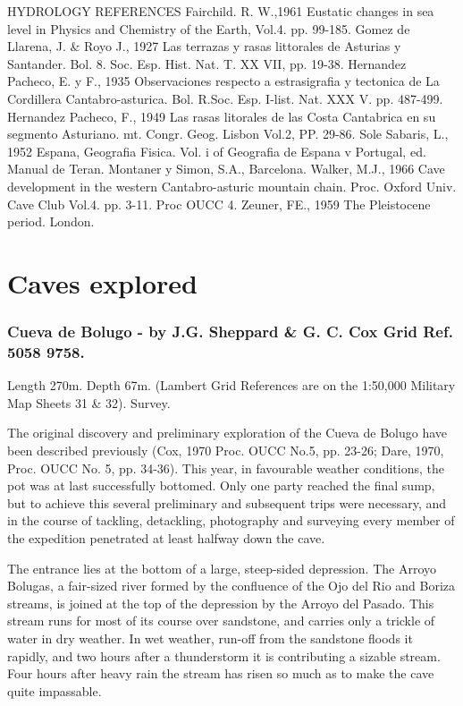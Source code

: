 \documentclass[11pt, a4paper, twoside]{memoir}
\begin{document}
HYDROLOGY REFERENCES
Fairchild. R. W.,1961 Eustatic changes in sea level in Physics and Chemistry of the Earth, Vol.4. pp. 99-185.
Gomez de Llarena, J. \& Royo J., 1927 Las terrazas y rasas littorales de Asturias y Santander. Bol. 8. Soc. Esp. Hist. Nat. T. XX VII, pp. 19-38.
Hernandez Pacheco, E. y F., 1935 Observaciones respecto a estrasigrafia y tectonica de La Cordillera Cantabro-asturica. Bol. R.Soc. Esp. I-list. Nat. XXX V. pp. 487-499.
Hernandez Pacheco, F., 1949 Las rasas litorales de las Costa Cantabrica en su segmento Asturiano. mt. Congr. Geog. Lisbon Vol.2, PP. 29-86.
Sole Sabaris, L., 1952 Espana, Geografia Fisica. Vol. i of Geografia de Espana v Portugal, ed. Manual de Teran. Montaner y Simon, S.A., Barcelona.
Walker, M.J., 1966 Cave development in the western Cantabro-asturic mountain chain. Proc. Oxford Univ. Cave Club Vol.4. pp. 3-11. Proc OUCC 4.
Zeuner, FE., 1959 The Pleistocene period. London.



\chapter{Caves explored}

\subsection*{Cueva de Bolugo - by J.G. Sheppard \& G. C. Cox Grid Ref. 5058 9758.}

Length 270m. Depth 67m. (Lambert Grid References are on the 1:50,000 Military Map Sheets 31 \& 32). Survey.

The original discovery and preliminary exploration of the Cueva de Bolugo have been described previously (Cox, 1970 Proc. OUCC No.5, pp. 23-26; Dare, 1970, Proc. OUCC No. 5, pp. 34-36). This year, in favourable weather conditions, the pot was at last successfully bottomed. Only one party reached the final sump, but to achieve this several preliminary and subsequent trips were necessary, and in the course of tackling, detackling, photography and surveying every member of the expedition penetrated at least halfway down the cave.

The entrance lies at the bottom of a large, steep-sided depression. The Arroyo Bolugas, a fair-sized river formed by the confluence of the Ojo del Rio and Boriza streams, is joined at the top of the depression by the Arroyo del Pasado. This stream runs for most of its course over sandstone, and carries only a trickle of water in dry weather. In wet weather, run-off from the sandstone floods it rapidly, and two hours after a thunderstorm it is contributing a sizable stream. Four hours after heavy rain the stream has risen so much as to make the cave quite impassable.
\end{document}

